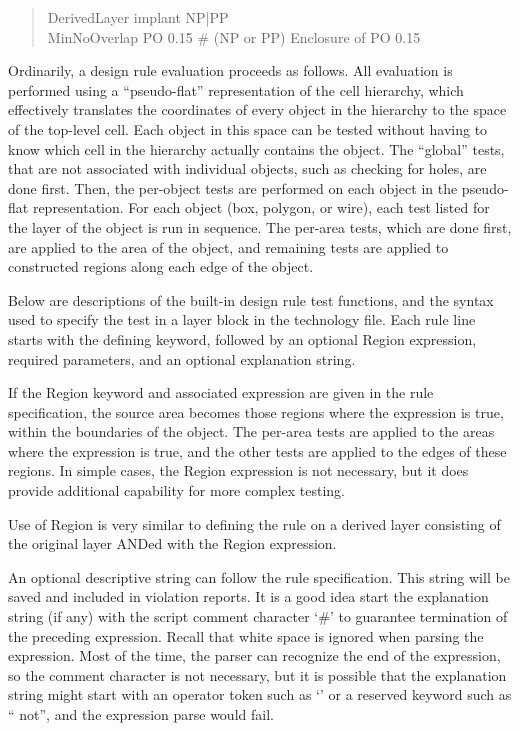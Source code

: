 \begin{quote}\vt
DerivedLayer implant NP|PP\\
MinNoOverlap PO 0.15 \# (NP or PP) Enclosure of PO 0.15
\end{quote}

Ordinarily, a design rule evaluation proceeds as follows.  All
evaluation is performed using a ``pseudo-flat'' representation of the
cell hierarchy, which effectively translates the coordinates of every
object in the hierarchy to the space of the top-level cell.  Each
object in this space can be tested without having to know which cell
in the hierarchy actually contains the object.  The ``global'' tests,
that are not associated with individual objects, such as checking for
holes, are done first.  Then, the per-object tests are performed on
each object in the pseudo-flat representation.  For each object (box,
polygon, or wire), each test listed for the layer of the object is run
in sequence.  The per-area tests, which are done first, are applied to
the area of the object, and remaining tests are applied to constructed
regions along each edge of the object.

Below are descriptions of the built-in design rule test functions, and
the syntax used to specify the test in a layer block in the technology
file.  Each rule line starts with the defining keyword, followed by an
optional {\et Region} expression, required parameters, and an optional
explanation string.

If the {\et Region} keyword and associated expression are given in the
rule specification, the source area becomes those regions where the
expression is true, within the boundaries of the object.  The per-area
tests are applied to the areas where the expression is true, and the
other tests are applied to the edges of these regions.  In simple
cases, the {\et Region} expression is not necessary, but it does
provide additional capability for more complex testing.

Use of {\vt Region} is very similar to defining the rule on
a derived layer consisting of the original layer ANDed with the
{\vt Region} expression.

An optional descriptive string can follow the rule specification.
This string will be saved and included in violation reports.
It is a good idea start the explanation string (if any) with the
script comment character `{\vt \#}' to guarantee termination of the
preceding expression.  Recall that white space is ignored when
parsing the expression.  Most of the time, the parser can recognize
the end of the expression, so the comment character is not necessary,
but it is possible that the explanation string might start with an
operator token such as `{\vt *}' or a reserved keyword such as ``{\vt
not}'', and the expression parse would fail.

